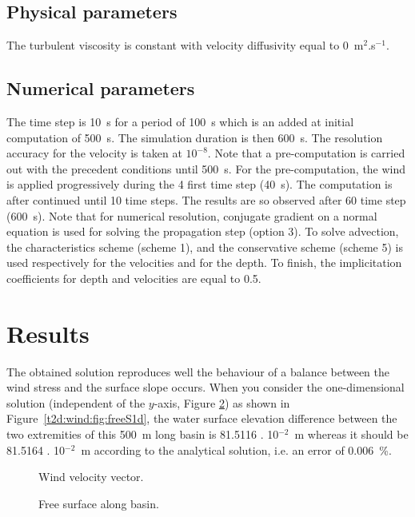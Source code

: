 \subsection{Physical parameters}

The turbulent viscosity is constant with velocity 
diffusivity equal to 0~m$^2$.s$^{-1}$.

\subsection{Numerical parameters}

The time step is 10~s for a period of 100~s which is an added at initial computation 
of 500~s. The simulation duration is then 600~s. The resolution accuracy for the 
velocity is taken at $10^{-8}$.
Note that a pre-computation is carried out with the precedent conditions until 500~s.
 For the pre-computation, the wind is applied progressively during 
the 4 first time step (40~s). 
The computation is after continued until 10 time steps. 
The results are so observed after 60 time step (600~s). 
Note that for numerical resolution, conjugate gradient on a normal equation 
is used for solving the propagation step (option 3). To solve advection, 
the characteristics scheme (scheme 1), and the conservative scheme (scheme 5) 
is used respectively for the velocities and for the depth. To finish, the implicitation 
coefficients for depth and velocities are equal to 0.5.\\

\section{Results}

The obtained  solution reproduces well the behaviour of a balance 
between the wind stress and the surface slope occurs. 
When you consider the one-dimensional solution (independent of the $y$-axis, 
Figure \ref{t2d:wind:fig:freeSbasin}) as shown in Figure~\ref{t2d:wind:fig:freeS1d}, 
the water surface elevation difference between 
the two extremities of this 500~m long basin is 81.5116 . 10$^{-2}$~m 
whereas it should be 81.5164 . 10$^{-2}$~m according to the analytical 
solution, i.e. an error of 0.006~\%. %

\begin{figure}[H]
 \centering
 \caption{Wind velocity vector.}
 \label{t2d:wind:fig:windvelo}
\end{figure}
\begin{figure}[H]
 \centering
 \caption{Free surface along basin.}
 \label{t2d:wind:fig:freeSbasin}
\end{figure}


